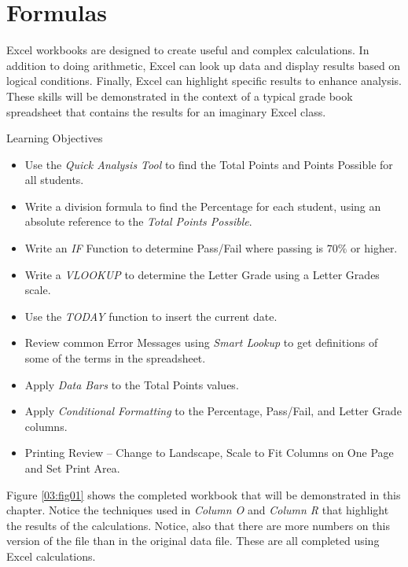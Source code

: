 \chapter{Formulas}\label{ch03:formulas}

Excel workbooks are designed to create useful and complex calculations. In addition to doing arithmetic, Excel can look up data and display results based on logical conditions. Finally, Excel can highlight specific results to enhance analysis. These skills will be demonstrated in the context of a typical grade book spreadsheet that contains the results for an imaginary Excel class.

\begin{center}
	\begin{objbox}{Learning Objectives}
		\begin{itemize}
			\setlength{\itemsep}{0pt}
			\setlength{\parskip}{0pt}
			\setlength{\parsep}{0pt}

			\item Use the \textit{Quick Analysis Tool} to find the Total Points and Points Possible for all students.
			\item Write a division formula to find the Percentage for each student, using an absolute reference to the \textit{Total Points Possible}.
			\item Write an \textit{IF} Function to determine Pass/Fail where passing is $ 70\% $ or higher.
			\item Write a \textit{VLOOKUP} to determine the Letter Grade using a Letter Grades scale.
			\item Use the \textit{TODAY} function to insert the current date.
			\item Review common Error Messages using \textit{Smart Lookup} to get definitions of some of the terms in the spreadsheet.
			\item Apply \textit{Data Bars} to the Total Points values.
			\item Apply \textit{Conditional Formatting} to the Percentage, Pass/Fail, and Letter Grade columns.
			\item Printing Review – Change to Landscape, Scale to Fit Columns on One Page and Set Print Area.
			
		\end{itemize}
	\end{objbox}
\end{center}

Figure \ref{03:fig01} shows the completed workbook that will be demonstrated in this chapter. Notice the techniques used in \textit{Column O} and \textit{Column R} that highlight the results of the calculations. Notice, also that there are more numbers on this version of the file than in the original data file. These are all completed using Excel calculations.


